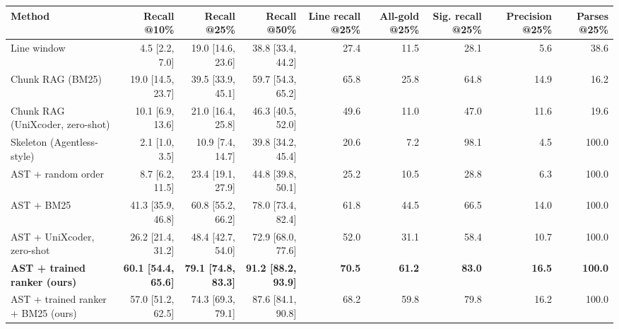 \begin{tabular}{lrrrrrrrr}
\toprule
Method & Recall @10\% & Recall @25\% & Recall @50\% & Line recall @25\% & All-gold @25\% & Sig. recall @25\% & Precision @25\% & Parses @25\% \\
\midrule
Line window & 4.5 [2.2, 7.0] & 19.0 [14.6, 23.6] & 38.8 [33.4, 44.2] & 27.4 & 11.5 & 28.1 & 5.6 & 38.6 \\
Chunk RAG (BM25) & 19.0 [14.5, 23.7] & 39.5 [33.9, 45.1] & 59.7 [54.3, 65.2] & 65.8 & 25.8 & 64.8 & 14.9 & 16.2 \\
Chunk RAG (UniXcoder, zero-shot) & 10.1 [6.9, 13.6] & 21.0 [16.4, 25.8] & 46.3 [40.5, 52.0] & 49.6 & 11.0 & 47.0 & 11.6 & 19.6 \\
Skeleton (Agentless-style) & 2.1 [1.0, 3.5] & 10.9 [7.4, 14.7] & 39.8 [34.2, 45.4] & 20.6 & 7.2 & 98.1 & 4.5 & 100.0 \\
AST + random order & 8.7 [6.2, 11.5] & 23.4 [19.1, 27.9] & 44.8 [39.8, 50.1] & 25.2 & 10.5 & 28.8 & 6.3 & 100.0 \\
AST + BM25 & 41.3 [35.9, 46.8] & 60.8 [55.2, 66.2] & 78.0 [73.4, 82.4] & 61.8 & 44.5 & 66.5 & 14.0 & 100.0 \\
AST + UniXcoder, zero-shot & 26.2 [21.4, 31.2] & 48.4 [42.7, 54.0] & 72.9 [68.0, 77.6] & 52.0 & 31.1 & 58.4 & 10.7 & 100.0 \\
\textbf{AST + trained ranker (ours)} & \textbf{60.1 [54.4, 65.6]} & \textbf{79.1 [74.8, 83.3]} & \textbf{91.2 [88.2, 93.9]} & \textbf{70.5} & \textbf{61.2} & \textbf{83.0} & \textbf{16.5} & \textbf{100.0} \\
AST + trained ranker + BM25 (ours) & 57.0 [51.2, 62.5] & 74.3 [69.3, 79.1] & 87.6 [84.1, 90.8] & 68.2 & 59.8 & 79.8 & 16.2 & 100.0 \\
\bottomrule
\end{tabular}
